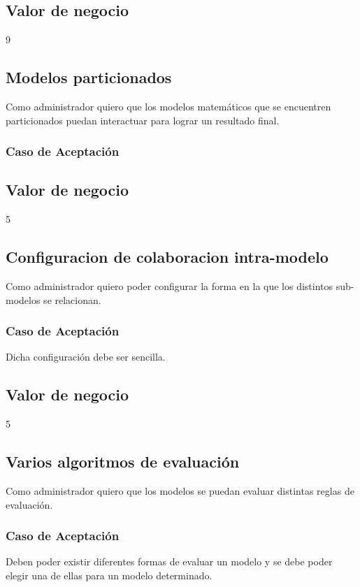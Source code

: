 \subsection*{Valor de negocio}
9


\linea 
\subsection*{Modelos particionados}
Como administrador quiero que los modelos matemáticos que se encuentren particionados puedan interactuar para lograr un resultado final.
\subsubsection*{Caso de Aceptación}
\subsection*{Valor de negocio}
5


\linea 
\subsection*{Configuracion de colaboracion intra-modelo}
Como administrador quiero poder configurar la forma en la que los distintos sub-modelos se relacionan.
\subsubsection*{Caso de Aceptación}
Dicha configuración debe ser sencilla. %
\subsection*{Valor de negocio}
5


\linea 
\subsection*{Varios algoritmos de evaluación}
Como administrador quiero que los modelos se puedan evaluar distintas reglas de evaluación.
\subsubsection*{Caso de Aceptación}
Deben poder existir diferentes formas de evaluar un modelo y se debe poder elegir una de ellas para un modelo determinado. 
